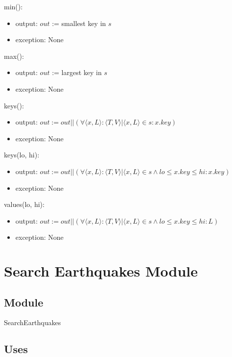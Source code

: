 \documentclass[12pt]{article}
\begin{document}
\noindent min():
\begin{itemize}
\item output: $out$ := smallest key in $s$
\item exception: None
\end{itemize}

\noindent max():
\begin{itemize}
\item output: $out$ := largest key in $s$
\item exception: None
\end{itemize}

\noindent keys():
\begin{itemize}
\item output: $out := out || (\forall \langle x, L \rangle : \langle T, V \rangle | \langle x, L \rangle \in s : x.key)$
\item exception: None
\end{itemize}

\noindent keys(lo, hi):
\begin{itemize}
\item output: $out := out || (\forall \langle x, L \rangle : \langle T, V \rangle | \langle x, L \rangle \in s \wedge
lo \le x.key \le hi : x.key)$
\item exception: None
\end{itemize}

\noindent values(lo, hi):
\begin{itemize}
\item output: $out := out || (\forall \langle x, L \rangle : \langle T, V \rangle | \langle x, L \rangle \in s \wedge
lo \le x.key \le hi : L)$
\item exception: None
\end{itemize}



\newpage

\section* {Search Earthquakes Module}

\subsection* {Module}

SearchEarthquakes

\subsection* {Uses}
\end{document}
